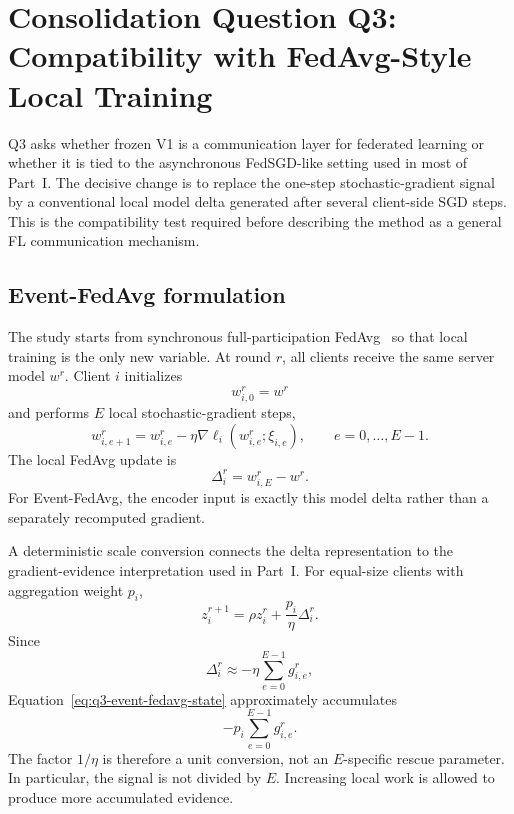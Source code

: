 \section{Consolidation Question Q3: Compatibility with FedAvg-Style Local Training}
\label{sec:consolidation-q3}

Q3 asks whether frozen V1 is a communication layer for federated learning or whether it is tied to the asynchronous FedSGD-like setting used in most of Part~I. The decisive change is to replace the one-step stochastic-gradient signal by a conventional local model delta generated after several client-side SGD steps. This is the compatibility test required before describing the method as a general FL communication mechanism.

\subsection{Event-FedAvg formulation}

The study starts from synchronous full-participation FedAvg~\cite{mcmahan2017fedavg} so that local training is the only new variable. At round $r$, all clients receive the same server model $w^r$. Client $i$ initializes
\begin{equation}
    w_{i,0}^r=w^r
\end{equation}
and performs $E$ local stochastic-gradient steps,
\begin{equation}
    w_{i,e+1}^r
    =w_{i,e}^r-\eta\nabla\ell_i(w_{i,e}^r;\xi_{i,e}),
    \qquad e=0,\ldots,E-1.
\end{equation}
The local FedAvg update is
\begin{equation}
    \Delta_i^r=w_{i,E}^r-w^r.
    \label{eq:q3-local-delta}
\end{equation}
For Event-FedAvg, the encoder input is exactly this model delta rather than a separately recomputed gradient.

A deterministic scale conversion connects the delta representation to the gradient-evidence interpretation used in Part~I. For equal-size clients with aggregation weight $p_i$,
\begin{equation}
    \boxed{
    z_i^{r+1}
    =\rho z_i^r
    +\frac{p_i}{\eta}\Delta_i^r.
    }
    \label{eq:q3-event-fedavg-state}
\end{equation}
Since
\begin{equation}
    \Delta_i^r
    \approx
    -\eta\sum_{e=0}^{E-1}g_{i,e}^r,
\end{equation}
Equation~\eqref{eq:q3-event-fedavg-state} approximately accumulates
\begin{equation}
    -p_i\sum_{e=0}^{E-1}g_{i,e}^r.
\end{equation}
The factor $1/\eta$ is therefore a unit conversion, not an $E$-specific rescue parameter. In particular, the signal is not divided by $E$. Increasing local work is allowed to produce more accumulated evidence.

